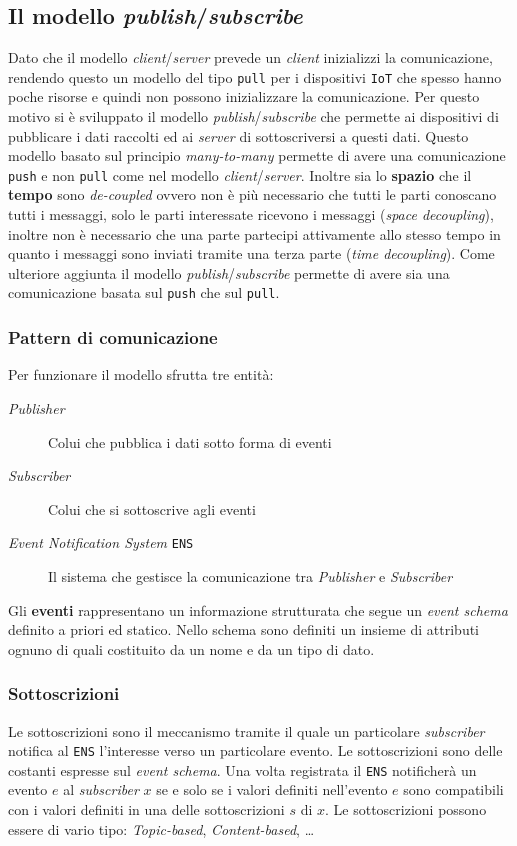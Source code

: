     \subsection{Il modello \textit{publish}/\textit{subscribe} }
        Dato che il modello \textit{client}/\textit{server} prevede un \textit{client} inizializzi la comunicazione, rendendo questo un modello del tipo \texttt{pull} per i dispositivi \texttt{IoT} che spesso hanno poche risorse e quindi non possono inizializzare la comunicazione. Per questo motivo si è sviluppato il modello \textit{publish}/\textit{subscribe} che permette ai dispositivi di pubblicare i dati raccolti ed ai \textit{server} di sottoscriversi a questi dati. Questo modello basato sul principio \textit{many-to-many} permette di avere una comunicazione \texttt{push} e non \texttt{pull} come nel modello \textit{client}/\textit{server}. Inoltre sia lo \textbf{spazio} che il \textbf{tempo} sono \textit{de-coupled} ovvero non è più necessario che tutti le parti conoscano tutti i messaggi, solo le parti interessate ricevono i messaggi (\textit{space decoupling}), inoltre non è necessario che una parte partecipi attivamente allo stesso tempo in quanto i messaggi sono inviati tramite una terza parte (\textit{time decoupling}). Come ulteriore aggiunta il modello \textit{publish}/\textit{subscribe} permette di avere sia una comunicazione basata sul \texttt{push} che sul \texttt{pull}.
        \subsubsection{Pattern di comunicazione} 
            Per funzionare il modello sfrutta tre entità:
                \begin{description}
                    \item[\textit{Publisher}] Colui che pubblica i dati sotto forma di eventi
                    \item[\textit{Subscriber}] Colui che si sottoscrive agli eventi
                    \item[\textit{Event Notification System} \texttt{ENS}] Il sistema che gestisce la comunicazione tra \textit{Publisher} e \textit{Subscriber}
                \end{description}
            Gli \textbf{eventi} rappresentano un informazione strutturata che segue un \textit{event schema} definito a priori ed statico. Nello schema sono definiti un insieme di attributi ognuno di quali costituito da un nome e da un tipo di dato.
        \subsubsection{Sottoscrizioni}
            Le sottoscrizioni sono il meccanismo tramite il quale un particolare \textit{subscriber} notifica al \texttt{ENS} l'interesse verso un particolare evento. Le sottoscrizioni sono delle costanti espresse sul \textit{event schema}. Una volta registrata il \texttt{ENS} notificherà un evento $e$ al \textit{subscriber} $x$ se e solo se i valori definiti nell'evento $e$ sono compatibili con i valori definiti in una delle sottoscrizioni $s$ di $x$.\newline
            Le sottoscrizioni possono essere di vario tipo: \textit{Topic-based}, \textit{Content-based}, \dots
